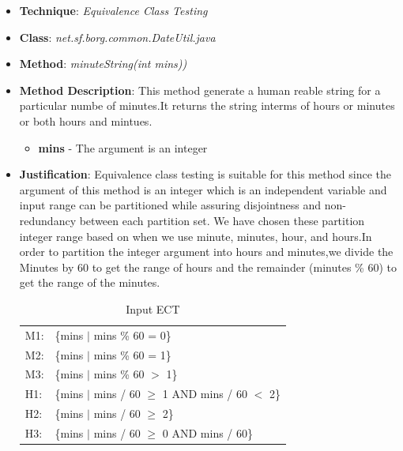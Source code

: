 \documentclass[fontsize=12pt,paper=letter,twoside]{scrartcl}
\begin{document}
\begin{itemize}
\item \textbf{Technique}: \emph{Equivalence Class Testing}
\item \textbf{Class}: \emph{net.sf.borg.common.DateUtil.java}
\item \textbf{Method}: \emph{minuteString(int mins))}
\item \textbf{Method Description}:
This method generate a human reable string for a particular numbe of minutes.It returns the string interms of hours or minutes or both hours and mintues.
\begin{itemize}
\item \textbf{mins} - The argument is an integer
\end{itemize}
\item \textbf{Justification}: Equivalence class testing is suitable for this method since the argument of this method is an integer which is an independent variable and input range can be partitioned while assuring disjointness and non-redundancy between each partition set. We have chosen these partition integer range based on when we use minute, minutes, hour, and hours.In order to partition the integer argument into hours and minutes,we divide the Minutes by 60 to get the range of hours and the remainder (minutes \% 60) to get the range of the minutes.
\newpage
\begin{table}[!htb]
\caption{Input ECT}
\label{input-ectl}
\begin{tabular}{ll}
M1: & \{mins $|$ mins \% 60 = 0\}                                    \\
M2: & \{mins $|$ mins \% 60 = 1\}                                    \\
M3: & \{mins $|$ mins \% 60 $>$  1\}                         \\
H1: & \{mins $|$ mins / 60 $\geq$ 1 AND mins / 60 $<$ 2\} \\
H2: & \{mins $|$ mins / 60 $\geq$ 2\}                         \\
H3: & \{mins $|$ mins / 60 $\geq$ 0 AND mins / 60\}                                   \\
\end{tabular}
\end{table}


\end{itemize}
\end{document}
